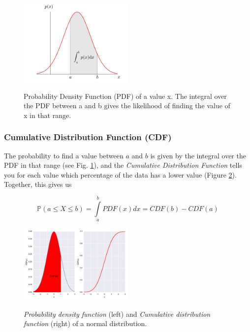 \begin{figure}
  \centering
  \includegraphics[width=0.5\textwidth]{../Images/PDF.png}\\
  \caption{Probability Density Function (PDF) of a value x. The integral over the PDF between a and b gives the likelihood of finding the value of x in that range.}\label{fig:PDF}
\end{figure}

\subsubsection{Cumulative Distribution Function (CDF)}

The probability to find a value between $a$ and $b$ is given by the integral over the PDF in that range (see Fig. \ref{fig:PDF}), and the \emph{Cumulative Distribution Function} tells you for each value which percentage of the data has a lower value (Figure \ref{fig:CDF}). Together, this gives us

\begin{equation}
   \mathbb{P}(a \leq X \leq b) = \int\limits_a^b {PDF(x)dx} = CDF(b) - CDF(a)
\end{equation}


\begin{figure}[ht]
  \centering
  \includegraphics[width=0.5\textwidth]{../Images/PDF_CDF.png}\\
  \caption{\emph{Probability density function} (left) and \emph{Cumulative distribution function} (right) of a normal distribution.}\label{fig:CDF}
\end{figure}

